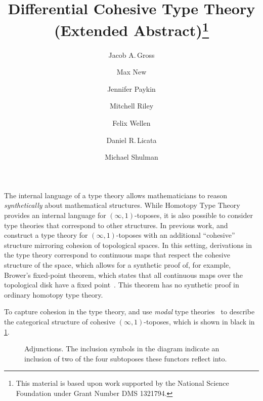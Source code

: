 \documentclass{article}
\title{Differential Cohesive Type Theory (Extended Abstract)\thanks{This
    material is based upon work supported by the National Science Foundation
    under Grant Number DMS 1321794.}}
\author{Jacob A.\,Gross}
\affil[1]{University of Pittsburgh}
\author[2]{Max New}
\affil[2]{Northeastern University}
\author[3]{Jennifer Paykin}
\affil[3]{University of Pennsylvania}
\author[4]{Mitchell Riley}
\affil[4]{Wesleyan University}
\author[5]{Felix Wellen}
\affil[5]{Karlsruhe Institute of Technology}
\author[4]{Daniel R.\,Licata}
\author[6]{Michael Shulman}
\affil[6]{University of San Diego}
\date{}
\begin{document}
\maketitle


The internal language of a type theory allows mathematicians to reason
\emph{synthetically} about mathematical structures. While Homotopy Type Theory
provides an internal language for $(∞,1)$-toposes, it is also possible to
consider type theories that correspond to other structures. In previous work,
\citet{Shulman2015} and \citet{Licata2016} construct a type theory for
$(∞,1)$-toposes with an additional ``cohesive'' structure mirroring cohesion of
topological spaces. In this setting, derivations in the type theory correspond
to continuous maps that respect the cohesive structure of the space, which
allows for a synthetic proof of, for example, Brower's fixed-point theorem,
which states that all continuous maps over the topological disk have a fixed
point~\citep{Shulman2015}. This theorem has no synthetic proof in ordinary
homotopy type theory.

To capture cohesion in the type theory, \citep{Shulman2015} and
\citep{Licata2016} use \emph{modal} type theories~
to describe the categorical structure of cohesive $(∞,1)$-toposes, which is
shown in black in \cref{fig:modalities}. 

\begin{figure}
\begin{center}
\end{center}
\caption{Adjunctions.  The inclusion symbols in
  the diagram indicate an inclusion of two of the four subtoposes these functors
  reflect into. }
\label{fig:modalities}
\end{figure}
\end{document}
